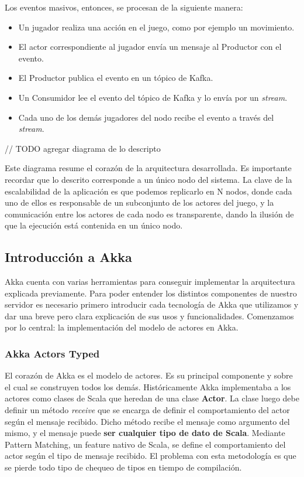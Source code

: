 Los eventos masivos, entonces, se procesan de la siguiente manera:

\begin{itemize}
    \item Un jugador realiza una acción en el juego, como por ejemplo un movimiento.
    \item El actor correspondiente al jugador envía un mensaje al Productor con el evento.
    \item El Productor publica el evento en un tópico de Kafka.
    \item Un Consumidor lee el evento del tópico de Kafka y lo envía por un \textit{stream}.
    \item Cada uno de los demás jugadores del nodo recibe el evento a través del \textit{stream}.
\end{itemize}

// TODO agregar diagrama de lo descripto

Este diagrama resume el corazón de la arquitectura desarrollada. Es importante recordar que lo descrito corresponde a un único nodo del sistema.
La clave de la escalabilidad de la aplicación es que podemos replicarlo en N nodos, donde cada uno de ellos es responsable de un subconjunto de los actores del juego,
y la comunicación entre los actores de cada nodo es transparente, dando la ilusión de que la ejecución está contenida en un único nodo.

\subsection{Introducción a Akka}

\noindent Akka cuenta con varias herramientas para conseguir implementar la arquitectura explicada previamente. Para poder entender los distintos componentes de nuestro servidor
es necesario primero introducir cada tecnología de Akka que utilizamos y dar una breve pero clara explicación de sus usos y funcionalidades.
Comenzamos por lo central: la implementación del modelo de actores en Akka. 

\subsubsection{Akka Actors Typed}

\noindent El corazón de Akka es el modelo de actores. Es su principal componente y sobre el cual se construyen todos los demás.
Históricamente Akka implementaba a los actores como clases de Scala que heredan de una clase \textbf{Actor}.
La clase luego debe definir un método \textit{receive} que se encarga de definir el comportamiento del actor según el mensaje recibido.
Dicho método recibe el mensaje como argumento del mismo, y el mensaje puede \textbf{ser cualquier tipo de dato de Scala}.
Mediante Pattern Matching, un feature nativo de Scala, se define el comportamiento del actor según el tipo de mensaje recibido.
El problema con esta metodología es que se pierde todo tipo de chequeo de tipos en tiempo de compilación.

